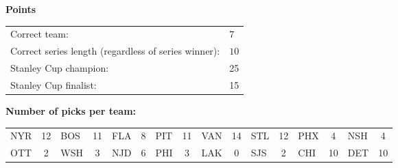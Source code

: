 \documentclass[10pt]{article}
\begin{document}
{\bf Points}\\
\begin{minipage}{12cm}
    \begin{tabular}{l l}
        Correct team:	& $7$\\
        Correct series length (regardless of series winner):	& $10$\\
        Stanley Cup champion:	& 25\\
        Stanley Cup finalist:	& 15\\
    \end{tabular}

    \vspace{1cm}
    {\bf Number of picks per team:}\\
    \begin{tabular}{lc | lc | lc | lc | lc | lc | lc | lc }
        NYR & 12 & BOS & 11 & FLA & 8 & PIT & 11 & VAN & 14 & STL & 12 & PHX & 4 & NSH & 4 \\
        OTT & 2 & WSH & 3 & NJD & 6 & PHI & 3 & LAK & 0 & SJS & 2 & CHI & 10 & DET & 10 \\
    \end{tabular}
\end{minipage}
\end{document}
